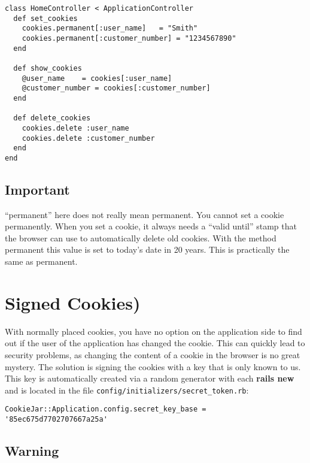 \documentclass[a4paper]{book}
\begin{document}
\begin{shaded}\begin{verbatim}
class HomeController < ApplicationController
  def set_cookies
    cookies.permanent[:user_name]   = "Smith"
    cookies.permanent[:customer_number] = "1234567890"
  end

  def show_cookies
    @user_name    = cookies[:user_name]
    @customer_number = cookies[:customer_number]
  end

  def delete_cookies
    cookies.delete :user_name
    cookies.delete :customer_number
  end
end
\end{verbatim}\end{shaded}

\subsection{Important}\label{important-12}

“permanent” here does not really mean permanent. You cannot set a cookie permanently. When you set a cookie, it always needs a “valid until” stamp that the browser can use to automatically delete old cookies. With the method permanent this value is set to today's date in 20 years. This is practically the same as permanent.

\section{Signed Cookies)}\label{signed-cookies}

With normally placed cookies, you have no option on the application side to find out if the user of the application has changed the cookie. This can quickly lead to security problems, as changing the content of a cookie in the browser is no great mystery. The solution is signing the cookies with a key that is only known to us. This key is automatically created via a random generator with each \textbf{rails new} and is located in the file \texttt{config/initializers/secret\_token.rb}:

\begin{shaded}\begin{verbatim}
CookieJar::Application.config.secret_key_base = '85ec675d7702707667a25a'
\end{verbatim}\end{shaded}

\subsection{Warning}\label{warning-13}
\end{document}
